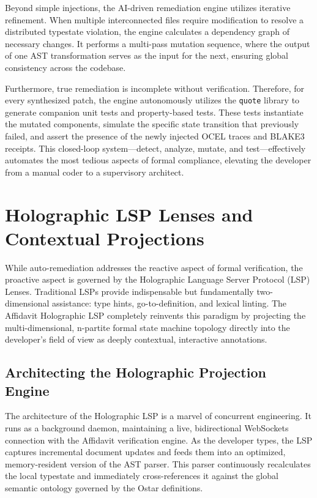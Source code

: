 Beyond simple injections, the AI-driven remediation engine utilizes iterative refinement. When multiple interconnected files require modification to resolve a distributed typestate violation, the engine calculates a dependency graph of necessary changes. It performs a multi-pass mutation sequence, where the output of one AST transformation serves as the input for the next, ensuring global consistency across the codebase. 

Furthermore, true remediation is incomplete without verification. Therefore, for every synthesized patch, the engine autonomously utilizes the \texttt{quote} library to generate companion unit tests and property-based tests. These tests instantiate the mutated components, simulate the specific state transition that previously failed, and assert the presence of the newly injected OCEL traces and BLAKE3 receipts. This closed-loop system---detect, analyze, mutate, and test---effectively automates the most tedious aspects of formal compliance, elevating the developer from a manual coder to a supervisory architect.

\section{Holographic LSP Lenses and Contextual Projections}
\label{sec:qol_lsp_lenses}

While auto-remediation addresses the reactive aspect of formal verification, the proactive aspect is governed by the Holographic Language Server Protocol (LSP) Lenses. Traditional LSPs provide indispensable but fundamentally two-dimensional assistance: type hints, go-to-definition, and lexical linting. The Affidavit Holographic LSP completely reinvents this paradigm by projecting the multi-dimensional, n-partite formal state machine topology directly into the developer's field of view as deeply contextual, interactive annotations.

\subsection{Architecting the Holographic Projection Engine}

The architecture of the Holographic LSP is a marvel of concurrent engineering. It runs as a background daemon, maintaining a live, bidirectional WebSockets connection with the Affidavit verification engine. As the developer types, the LSP captures incremental document updates and feeds them into an optimized, memory-resident version of the AST parser. This parser continuously recalculates the local typestate and immediately cross-references it against the global semantic ontology governed by the Ostar definitions.

